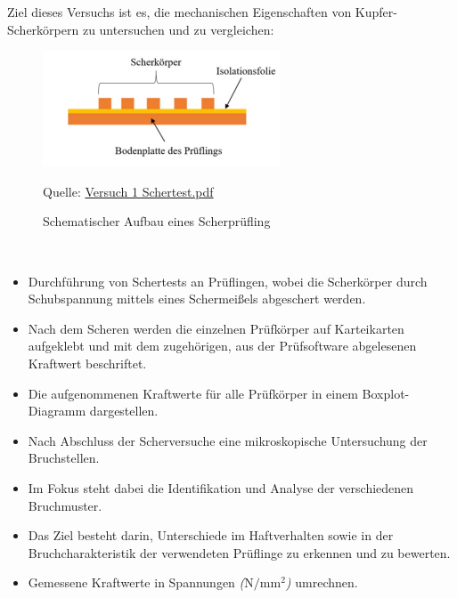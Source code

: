 Ziel dieses Versuchs ist es, die mechanischen Eigenschaften von Kupfer-Scherkörpern zu untersuchen und zu vergleichen:
\\
\vspace{0.05cm}
\begin{figure}[h]
    \centering
    \includegraphics[scale=0.95]{Bilder/schematik.png}
    \caption{ Schematischer Aufbau eines Scherprüfling}
    \par Quelle: \href{https://learn.fh-kiel.de/mod/folder/view.php?id=160797}{Versuch 1 Schertest.pdf}
    \vspace{0.2cm}
    \label{Abb.2: Schematischer Aufbau eines Scherprüfling } 
\end{figure}\\

\begin{itemize}
\item Durchführung von Schertests an Prüflingen, wobei die Scherkörper durch Schubspannung mittels eines Schermeißels abgeschert werden.
\item Nach dem Scheren werden die einzelnen Prüfkörper auf Karteikarten aufgeklebt und mit dem zugehörigen, aus der Prüfsoftware abgelesenen Kraftwert beschriftet.
\item Die aufgenommenen Kraftwerte für alle Prüfkörper in einem Boxplot-Diagramm dargestellen.
\item Nach Abschluss der Scherversuche eine mikroskopische Untersuchung der Bruchstellen.
\item Im Fokus steht dabei die Identifikation und Analyse der verschiedenen Bruchmuster.
\item Das Ziel besteht darin, Unterschiede im Haftverhalten sowie in der Bruchcharakteristik der verwendeten Prüflinge zu erkennen und zu bewerten.
\item Gemessene Kraftwerte in Spannungen \textit{($\mathrm{N/mm^2}$)}  umrechnen.
\end{itemize}

